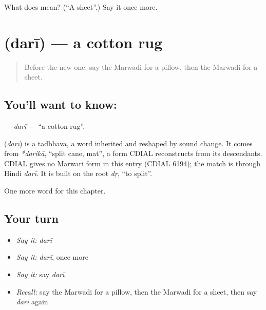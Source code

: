 \begin{tcolorbox}[breakable,colback=teal!4,colframe=teal!35!black,title={Before you move on}]
What does  mean? (\textquotedblleft{}A sheet\textquotedblright{}.) Say it once more.
\end{tcolorbox}
\section[\texorpdfstring{\mw{दरी} (darī)}{दरी (darī)}]{ (darī) — a cotton rug}

\label{lesson:MW-C123-dari}



\begin{quote}
Before the new one: say the Marwadi for a pillow, then the Marwadi for a sheet.
\end{quote}

\subsection*{You'll want to know: }
\textbf{} — \emph{darī} — \textquotedblleft{}a cotton rug\textquotedblright{}.

\begin{cousinweb}
\textbf{} (\emph{darī}) is a tadbhava, a word inherited and reshaped by sound change. It comes from \emph{*darikā}, \textquotedblleft{}split cane, mat\textquotedblright{}, a form CDIAL reconstructs from its descendants. CDIAL gives no Marwari form in this entry (CDIAL 6194); the match is through Hindi \emph{darī}. It is built on the root \emph{dṛ}, \textquotedblleft{}to split\textquotedblright{}.
\end{cousinweb}

\begin{grammarlens}[title={What you've built}]
One more word for this chapter.
\end{grammarlens}

\subsection*{Your turn}
\begin{itemize}
\raggedright
  \item \emph{Say it:} \emph{darī}
  \item \emph{Say it:} \emph{darī}, once more
  \item \emph{Say it:} say \emph{darī}
  \item \emph{Recall:} say the Marwadi for a pillow, then the Marwadi for a sheet, then say \emph{darī} again
\end{itemize}

